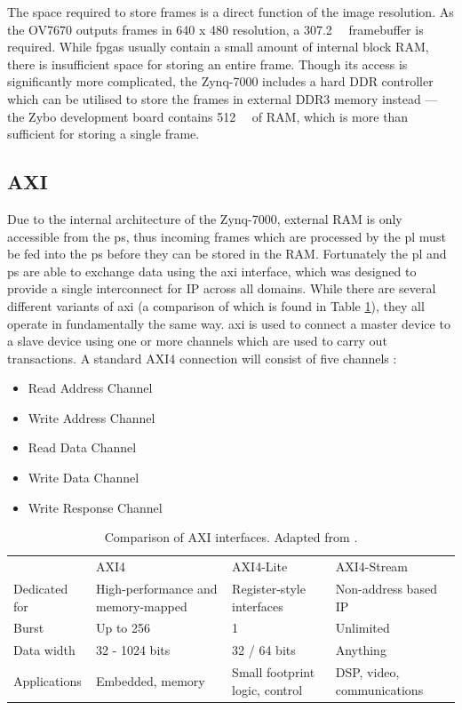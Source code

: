 The space required to store frames is a direct function of the image resolution. As the OV7670 outputs frames in 640 x 480 resolution, a \SI{307.2}{\kilo\byte} framebuffer is required. While \glspl{fpga} usually contain a small amount of internal block RAM, there is insufficient space for storing an entire frame. Though its access is significantly more complicated, the Zynq-7000 includes a hard DDR controller which can be utilised to store the frames in external DDR3 memory instead --- the Zybo development board contains \SI{512}{\mega\byte} of RAM, which is more than sufficient for storing a single frame.

\subsection{AXI}
Due to the internal architecture of the Zynq-7000, external RAM is only accessible from the \gls{ps}, thus incoming frames which are processed by the \gls{pl} must be fed into the \gls{ps} before they can be stored in the RAM. Fortunately the \gls{pl} and \gls{ps} are able to exchange data using the \gls{axi} interface, which was designed to provide a single interconnect for IP across all domains. While there are several different variants of \gls{axi} (a comparison of which is found in Table \ref{table:axi_comparison}), they all operate in fundamentally the same way. \gls{axi} is used to connect a master device to a slave device using one or more channels which are used to carry out transactions. A standard AXI4 connection will consist of five channels \cite{xilinx:ug1037}:
\begin{itemize}
  \item Read Address Channel
  \item Write Address Channel
  \item Read Data Channel
  \item Write Data Channel
  \item Write Response Channel
\end{itemize}

\begin{table}
\centering
\begin{tabular}{llll}
              & AXI4                               & AXI4-Lite                      & AXI4-Stream                \\
Dedicated for & High-performance and memory-mapped & Register-style interfaces      & Non-address based IP       \\
Burst         & Up to 256                          & 1                              & Unlimited                  \\
Data width    & 32 - 1024 bits                     & 32 / 64 bits                   & Anything                   \\
Applications  & Embedded, memory                   & Small footprint logic, control & DSP, video, communications
\end{tabular}
\caption{Comparison of AXI interfaces. Adapted from \cite{xilinx:ug1037}.}
\label{table:axi_comparison}
\end{table}

